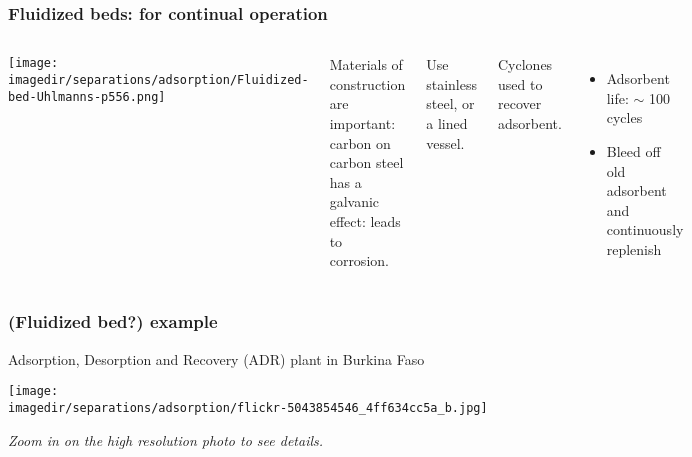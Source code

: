 \begin{frame}\frametitle{Fluidized beds: for continual operation}
	\begin{columns}[t]
			\begin{center}
				\texttt{[image: \\imagedir/separations/adsorption/Fluidized-bed-Uhlmanns-p556.png]}
			\end{center}
			\vspace{-18pt}
			Materials of construction are important: carbon on carbon steel has a galvanic effect: leads to corrosion.

			Use stainless steel, or a lined vessel.

			\vspace{12pt}
			Cyclones used to recover adsorbent.

			\begin{itemize}
				\item	Adsorbent life: $\sim$ 100 cycles
				\item	Bleed off old adsorbent and continuously replenish
			\end{itemize}
	\end{columns}
\end{frame}

\begin{frame}\frametitle{(Fluidized bed?) example}
	Adsorption, Desorption and Recovery (ADR) plant in Burkina Faso
	\begin{center}
		\texttt{[image: \\imagedir/separations/adsorption/flickr-5043854546\_4ff634cc5a\_b.jpg]}
	\end{center}
	\vspace{-12pt}
	\emph{Zoom in on the high resolution photo to see details.}
\end{frame}


